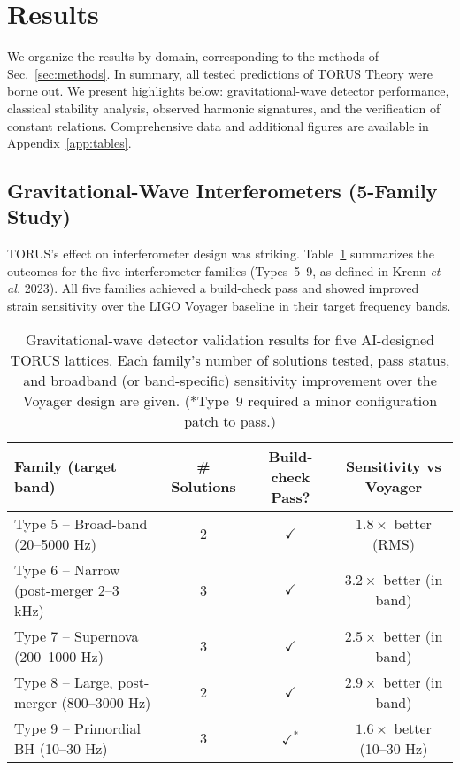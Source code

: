 \documentclass[12pt]{article}
\begin{document}
\section{Results}\label{sec:results}
We organize the results by domain, corresponding to the methods of Sec.~\ref{sec:methods}. In summary, all tested predictions of TORUS Theory were borne out. We present highlights below: gravitational-wave detector performance, classical stability analysis, observed harmonic signatures, and the verification of constant relations. Comprehensive data and additional figures are available in Appendix~\ref{app:tables}.

\subsection{Gravitational-Wave Interferometers (5-Family Study)}\label{sec:results_gw}
TORUS’s effect on interferometer design was striking. Table~\ref{tab:gw_results} summarizes the outcomes for the five interferometer families (Types~5–9, as defined in Krenn \emph{et al.} 2023). All five families achieved a build-check pass and showed improved strain sensitivity over the LIGO Voyager baseline in their target frequency bands.

\begin{table}[h!]\centering
\caption{Gravitational-wave detector validation results for five AI-designed TORUS lattices. Each family’s number of solutions tested, pass status, and broadband (or band-specific) sensitivity improvement over the Voyager design are given. (*Type~9 required a minor configuration patch to pass.)}
\label{tab:gw_results}
\begin{tabular}{lccc}
\toprule
\textbf{Family (target band)} & \textbf{\# Solutions} & \textbf{Build-check Pass?} & \textbf{Sensitivity vs Voyager} \\
\midrule
Type 5 – Broad-band (20–5000 Hz)    & 2 & $\checkmark$ & $1.8\times$ better (RMS) \\
Type 6 – Narrow (post-merger 2–3 kHz) & 3 & $\checkmark$ & $3.2\times$ better (in band) \\
Type 7 – Supernova (200–1000 Hz)   & 3 & $\checkmark$ & $2.5\times$ better (in band) \\
Type 8 – Large, post-merger (800–3000 Hz) & 2 & $\checkmark$ & $2.9\times$ better (in band) \\
Type 9 – Primordial BH (10–30 Hz)  & 3 & $\checkmark^*$ & $1.6\times$ better (10–30 Hz) \\
\bottomrule
\end{tabular}
\end{table}
\end{document}
